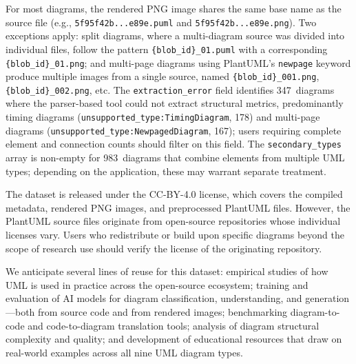 \documentclass[data,datadescriptor,submit,pdftex,moreauthors]{Definitions/mdpi}
\begin{document}
For most diagrams, the rendered PNG image shares the same base name as the source file (e.g., \texttt{5f95f42b...e89e.puml} and \texttt{5f95f42b...e89e.png}). Two exceptions apply: split diagrams, where a multi-diagram source was divided into individual files, follow the pattern \texttt{\{blob\_id\}\_01.puml} with a corresponding \texttt{\{blob\_id\}\_01.png}; and multi-page diagrams using PlantUML's \texttt{newpage} keyword produce multiple images from a single source, named \texttt{\{blob\_id\}\_001.png}, \texttt{\{blob\_id\}\_002.png}, etc. The \texttt{extraction\_error} field identifies 347~diagrams where the parser-based tool could not extract structural metrics, predominantly timing diagrams (\texttt{unsupported\_type:TimingDiagram}, 178) and multi-page diagrams (\texttt{unsupported\_type:NewpagedDiagram}, 167); users requiring complete element and connection counts should filter on this field. The \texttt{secondary\_types} array is non-empty for 983~diagrams that combine elements from multiple UML types; depending on the application, these may warrant separate treatment.

The dataset is released under the CC-BY-4.0 license, which covers the compiled metadata, rendered PNG images, and preprocessed PlantUML files. However, the PlantUML source files originate from open-source repositories whose individual licenses vary. Users who redistribute or build upon specific diagrams beyond the scope of research use should verify the license of the originating repository.

We anticipate several lines of reuse for this dataset: empirical studies of how UML is used in practice across the open-source ecosystem; training and evaluation of AI models for diagram classification, understanding, and generation---both from source code and from rendered images; benchmarking diagram-to-code and code-to-diagram translation tools; analysis of diagram structural complexity and quality; and development of educational resources that draw on real-world examples across all nine UML diagram types.


\vspace{6pt}

\end{document}
